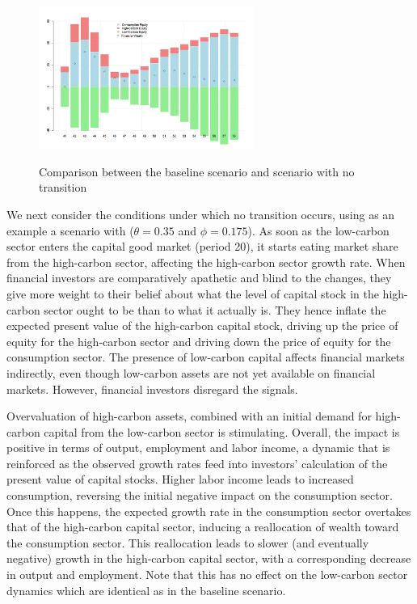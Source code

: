 \documentclass[authoryear]{article}
\begin{document}
\begin{figure}[h!]
  \quad \quad 
    \begin{minipage}[b]{.5\linewidth}
\centering\large 
    \includegraphics[width=7cm]{Figures/NoTransitionMarketCap.png}
    \label{Fig:NoTransMarketCap}
\end{minipage}
\vspace{0.2cm}
\caption{Comparison between the baseline scenario and scenario with no transition}\label{Fig:scen1}
\end{figure}

We next consider the conditions under which no transition occurs, using as an example a scenario with (\(\theta=0.35\) and \(\phi=0.175\)). As soon as the low-carbon sector enters the capital good market (period 20), it starts eating market share from the high-carbon sector, affecting the high-carbon sector growth rate. When financial investors are comparatively apathetic and blind to the changes, they give more weight to their belief about what the level of capital stock in the high-carbon sector ought to be than to what it actually is. They hence inflate the expected present value of the high-carbon capital stock, driving up the price of equity for the high-carbon sector and driving down the price of equity for the consumption sector. The presence of low-carbon capital affects financial markets indirectly, even though low-carbon assets are not yet available on financial markets. However, financial investors disregard the signals.

Overvaluation of high-carbon assets, combined with an initial demand for high-carbon capital from the low-carbon sector is stimulating. Overall, the impact is positive in terms of output, employment and labor income, a dynamic that is reinforced as the observed growth rates feed into investors' calculation of the present value of capital stocks. Higher labor income leads to increased consumption, reversing the initial negative impact on the consumption sector. Once this happens, the expected growth rate in the consumption sector overtakes that of the high-carbon capital sector, inducing a reallocation of wealth toward the consumption sector. This reallocation leads to slower (and eventually negative) growth in the high-carbon capital sector, with a corresponding decrease in output and employment. Note that this has no effect on the low-carbon sector dynamics which are identical as in the baseline scenario.
\end{document}
